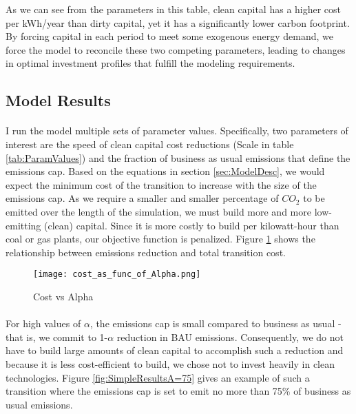 \documentclass{article}
\begin{document}
As we can see from the parameters in this table, clean capital has a higher cost per kWh/year than dirty capital, yet it has a significantly lower carbon footprint. By forcing capital in each period to meet some exogenous energy demand, we force the model to reconcile these two competing parameters, leading to changes in optimal investment profiles that fulfill the modeling requirements.



\subsection{Model Results}
\FloatBarrier

\paragraph{} I run the model multiple sets of parameter values. Specifically, two parameters of interest are the speed of clean capital cost reductions (Scale in table \ref{tab:ParamValues}) and the fraction of business as usual emissions that define the emissions cap. Based on the equations in section \ref{sec:ModelDesc}, we would expect the minimum cost of the transition to increase with the size of the emissions cap. As we require a smaller and smaller percentage of $CO_2$ to be emitted over the length of the simulation, we must build more and more low-emitting (clean) capital. Since it is more costly to build per kilowatt-hour than coal or gas plants, our objective function is penalized. Figure \ref{fig:costVsAlpha} shows the relationship between emissions reduction and total transition cost. 

\begin{figure}[h]
\texttt{[image: cost\_as\_func\_of\_Alpha.png]}
\caption{Cost vs Alpha\label{fig:costVsAlpha}}
\end{figure}


\FloatBarrier

\paragraph{} For high values of $\alpha$, the emissions cap is small compared to business as usual - that is, we commit to 1-$\alpha$ reduction in BAU emissions. Consequently, we do not have to build large amounts of clean capital to accomplish such a reduction and because it is less cost-efficient to build, we chose not to invest heavily in clean technologies. Figure \ref{fig:SimpleResultsA=75} gives an example of such a transition where the emissions cap is set to emit no more than 75\% of business as usual emissions. 
\end{document}
